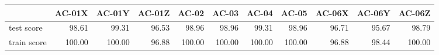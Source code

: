 \begin{tabular}{lrrrrrrrrrr}
\toprule
{} &  AC-01X &  AC-01Y &  AC-01Z &   AC-02 &   AC-03 &   AC-04 &   AC-05 &  AC-06X &  AC-06Y &  AC-06Z \\
\midrule
test score  &   98.61 &   99.31 &   96.53 &   98.96 &   98.96 &   99.31 &   98.96 &   96.71 &   95.67 &   98.79 \\
train score &  100.00 &  100.00 &   96.88 &  100.00 &  100.00 &  100.00 &  100.00 &   96.88 &   98.44 &  100.00 \\
\bottomrule
\end{tabular}
